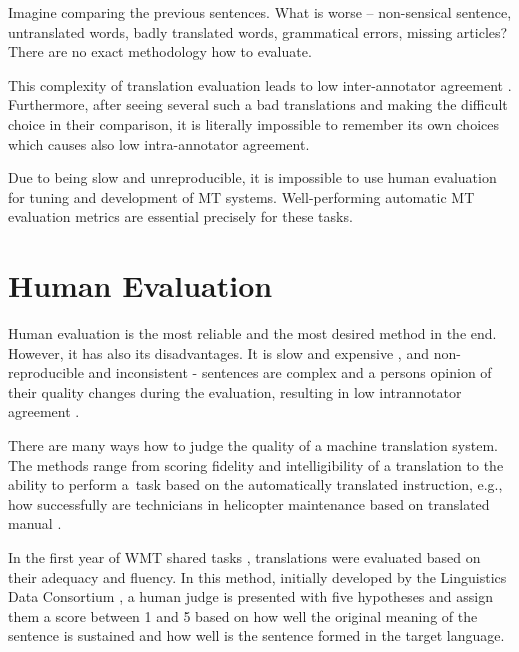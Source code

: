 Imagine comparing the previous sentences. What is worse -- non-sensical sentence, untranslated words, badly translated words, grammatical errors, missing articles? 
There are no exact methodology how to evaluate. 

This complexity of translation evaluation leads to low inter-annotator agreement \cite{wmt13}. 
Furthermore, after seeing several such a bad translations and making the difficult choice in their comparison, it is literally impossible to remember its own choices which causes also low intra-annotator agreement.

Due to being slow and unreproducible, it is impossible to use human evaluation for tuning and development of MT systems. 
Well-performing automatic MT evaluation metrics are essential precisely for these tasks. 









\section{Human Evaluation}
Human evaluation is the most reliable and the most desired method in the end.
However, it has also its disadvantages. 
It is slow and expensive , and non-reproducible and inconsistent - sentences are complex and a persons opinion of their quality changes during the evaluation, resulting in low intrannotator agreement .

There are many ways how to judge the quality of a machine translation system. 
The methods range from scoring fidelity and intelligibility of a translation to the ability to perform a~task based on the automatically translated instruction, e.g., how successfully are technicians in  helicopter maintenance based on translated manual \cite{Sinaiko}.

In the first year of WMT shared tasks \citep{koehn-monz:2006:WMT}, translations were evaluated based on their adequacy and fluency. 
In this method, initially  developed by the Linguistics Data Consortium ,  a human judge is presented with five hypotheses and assign them a score between 1 and 5 based on how well the original meaning of the sentence is sustained and how well is the sentence formed in the target language.

